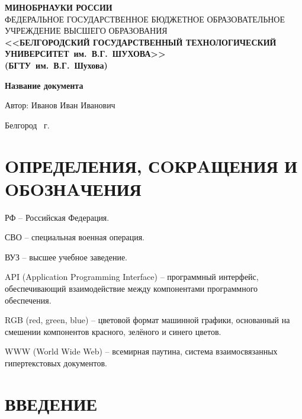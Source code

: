 \documentclass[14pt]{extarticle}
\begin{document}
\begin{titlepage}
	\centering %
	{\small
	\textbf{МИНОБРНАУКИ РОССИИ} \\[0.5em]
	ФЕДЕРАЛЬНОЕ ГОСУДАРСТВЕННОЕ БЮДЖЕТНОЕ ОБРАЗОВАТЕЛЬНОЕ УЧРЕЖДЕНИЕ 
	ВЫСШЕГО ОБРАЗОВАНИЯ \\[0.3em]
	\textbf{<<БЕЛГОРОДСКИЙ ГОСУДАРСТВЕННЫЙ ТЕХНОЛОГИЧЕСКИЙ\\УНИВЕРСИТЕТ~им.~В.Г.~ШУХОВА>>}\\
	\textbf{(БГТУ~им.~В.Г.~Шухова)}}
	\vspace*{\fill}\par %
	{\Large\bfseries Название документа\par}
	\vspace{2cm}
	{\normalsize Автор: Иванов Иван Иванович\par}
	\vspace{\fill} %
	{\normalsize Белгород \the\year \ г. \par}
\end{titlepage}
\restoregeometry
\initpagenumbering
\setcounter{page}{2}

\section*{OПРЕДЕЛЕНИЯ, СOКРAЩЕНИЯ И OБOЗНAЧЕНИЯ}
\par РФ -- Российская Федерация.
\par СВО -- специальная военная операция.
\par ВУЗ -- высшее учебное заведение.
\par API (Application Programming Interface) -- программный интерфейс, обеспечивающий взаимодействие между компонентами программного обеспечения.
\par RGB (red, green, blue) -- цветовой формат машинной графики, основанный на смешении компонентов красного, зелёного и синего цветов.
\par WWW (World Wide Web) -- всемирная паутина, система взаимосвязанных гипертекстовых документов.

\renewcommand{\contentsname}{\rucontentsname}
\tableofcontents

\section*[ВВЕДЕНИЕ]{ВВЕДЕНИЕ}
\lipsum[1-10]
\end{document}
